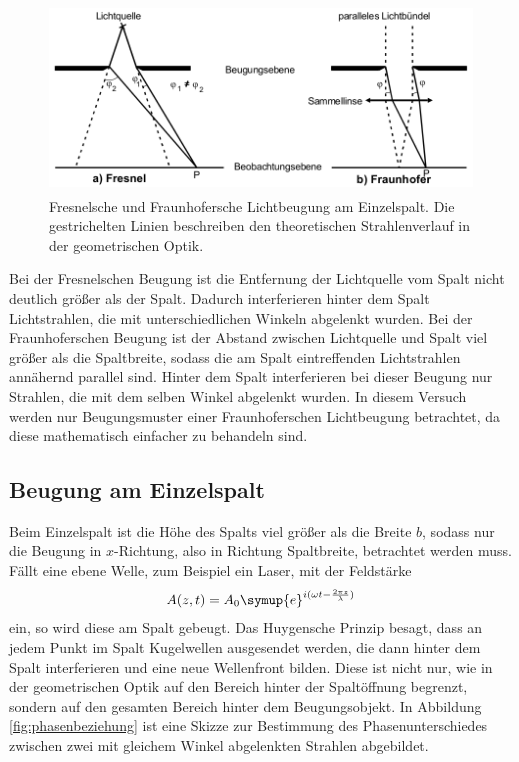 \begin{figure}
  \centering
  \includegraphics[height=5cm]{MeinePics/fraunfresnel.png}
  \caption{Fresnelsche und Fraunhofersche Lichtbeugung am Einzelspalt. Die
  gestrichelten Linien beschreiben den theoretischen Strahlenverlauf in der
  geometrischen Optik.\cite{anleitung}}
  \label{fig:fraunfresnel}
\end{figure}

\FloatBarrier

Bei der Fresnelschen Beugung ist die Entfernung der Lichtquelle vom Spalt
nicht deutlich größer als der Spalt. Dadurch interferieren hinter dem Spalt
Lichtstrahlen, die mit unterschiedlichen Winkeln abgelenkt wurden.
Bei der Fraunhoferschen Beugung ist der Abstand zwischen Lichtquelle und Spalt
viel größer als die Spaltbreite, sodass die am Spalt eintreffenden
Lichtstrahlen annähernd parallel sind. Hinter dem Spalt interferieren
bei dieser Beugung nur Strahlen, die mit dem selben Winkel abgelenkt wurden.
In diesem Versuch werden nur Beugungsmuster einer Fraunhoferschen
Lichtbeugung betrachtet, da diese mathematisch einfacher zu behandeln sind.


\subsection{Beugung am Einzelspalt}

Beim Einzelspalt ist die Höhe des Spalts viel größer als die Breite $b$, sodass
nur die Beugung in $x$-Richtung, also in Richtung Spaltbreite, betrachtet
werden muss.
Fällt eine ebene Welle, zum Beispiel ein Laser, mit der Feldstärke
\begin{align}
  A(z,t) = A_0 \symup{e}^{i(\omega t - \frac{2\pi z}{\lambda})}
\end{align}
ein, so wird diese am Spalt gebeugt. Das Huygensche Prinzip besagt, dass
an jedem Punkt im Spalt Kugelwellen ausgesendet werden, die dann hinter dem
Spalt interferieren und eine neue Wellenfront bilden. Diese ist nicht nur,
wie in der geometrischen Optik auf den Bereich hinter der Spaltöffnung begrenzt,
sondern auf den gesamten Bereich hinter dem Beugungsobjekt.
In Abbildung \ref{fig:phasenbeziehung} ist eine Skizze zur Bestimmung des
Phasenunterschiedes zwischen zwei mit gleichem Winkel abgelenkten Strahlen
abgebildet.


